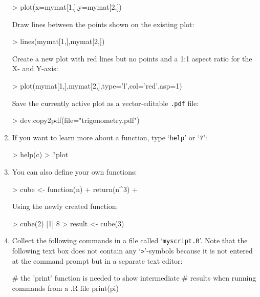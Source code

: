 \begin{enumerate}
\begin{console}
> plot(x=mymat[1,],y=mymat[2,])
\end{console}

Draw lines between the points shown on the existing plot:

\begin{console}
> lines(mymat[1,],mymat[2,])
\end{console}

Create a new plot with red lines but no points and a 1:1 aspect ratio
for the X- and Y-axis:

\begin{console}
> plot(mymat[1,],mymat[2,],type='l',col='red',asp=1)
\end{console}

Save the currently active plot as a vector-editable \texttt{.pdf}
file:

\begin{console}
> dev.copy2pdf(file="trigonometry.pdf")
\end{console}

\item If you want to learn more about a function, type `\texttt{help}' or
`\texttt{?}':

\begin{console}
> help(c)
> ?plot
\end{console}

\item You can also define your own functions:

\begin{console}
> cube <- function(n){
+     return(n^3)
+ }
\end{console}

Using the newly created function:

\begin{console}
> cube(2)
[1] 8
> result <- cube(3)
\end{console}

\item Collect the following commands in a file called
  `\texttt{myscript.R}'.  Note that the following text box does not
  contain any `\verb|>|'-symbols because it is not entered at the
  command prompt but in a separate text editor:

\begin{script}
# the 'print' function is needed to show intermediate
# results when running commands from a .R file
print(pi)
\end{script}


\end{enumerate}
